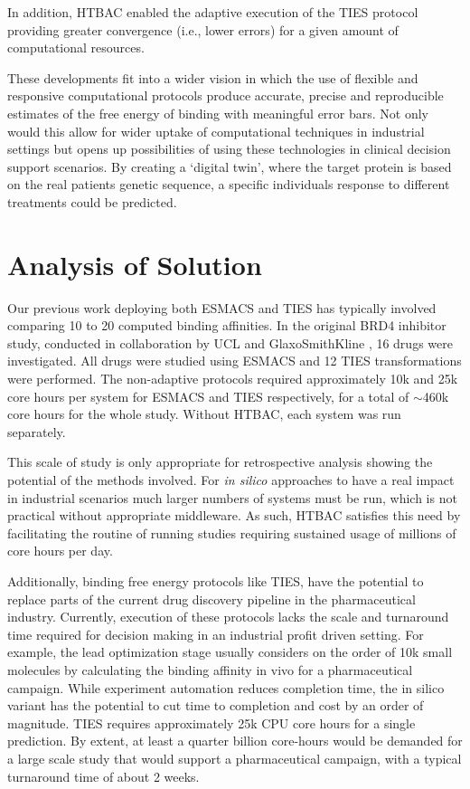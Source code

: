 \documentclass[conference]{IEEEtran}
\begin{document}
In addition, HTBAC enabled the adaptive execution of the TIES protocol providing 
greater convergence (i.e., lower errors) for a given amount of computational 
resources.

These developments fit into a wider vision in which the use of
flexible and responsive computational protocols produce accurate,
precise and reproducible estimates of the free energy of binding with
meaningful error bars. Not only would this allow for wider uptake of
computational techniques in industrial settings but opens up possibilities
of using these technologies in clinical decision support scenarios. By creating
a `digital twin', where the target protein is based on the real patients
genetic sequence, a specific individuals response to different
treatments could be predicted.



\section{Analysis of Solution}\label{sec:analysis}

Our previous work deploying both ESMACS and TIES has typically involved 
comparing 10 to 20 computed binding affinities. In the original BRD4 inhibitor 
study, conducted in collaboration by UCL and GlaxoSmithKline \cite{Wan2017brd4}, 
16 drugs were investigated. All drugs were studied using ESMACS and 12 TIES 
transformations were performed. The non-adaptive protocols required 
approximately 10k and 25k core hours per system for ESMACS and TIES 
respectively, for a total of $\sim$460k core hours for the whole study. Without 
HTBAC, each system was run separately. 

This scale of study is only appropriate for 
retrospective analysis showing the potential of the methods involved. For 
\textit{in silico} approaches to have a real impact in industrial scenarios much 
larger numbers of systems must be run, which is not practical without 
appropriate middleware. As such, HTBAC satisfies this need by facilitating the 
routine of running studies requiring sustained usage of millions of core hours 
per day.

Additionally, binding free energy protocols like TIES, have the potential to 
replace parts of the current drug discovery pipeline in the pharmaceutical 
industry. Currently, execution of these protocols lacks the scale and turnaround 
time required for decision making in an industrial profit driven setting. 
For example, the lead optimization stage usually considers on the order of 10k 
small molecules by calculating the binding affinity in vivo for a pharmaceutical 
campaign. While experiment automation reduces completion time, the in silico 
variant has the potential to cut time to completion and cost by an order of 
magnitude. TIES requires approximately 25k CPU core hours for a single prediction. 
By extent, at least a quarter billion core-hours would be demanded for a large 
scale study that would support a pharmaceutical campaign, with a typical 
turnaround time of about 2 weeks. 
\end{document}
